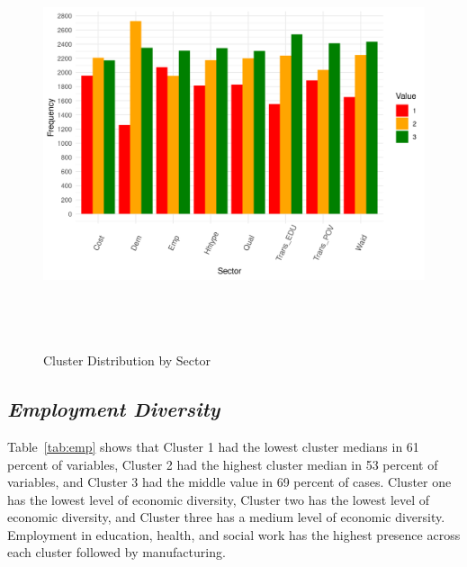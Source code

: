 \begin{figure}[htbp]
    \centering
     \includegraphics[width=1\textwidth, height=12cm]{plots/cluster_distribution.png}
     \caption{Cluster Distribution by Sector}
     \label{fig:cluster_dis}
 \end{figure}

\subsection{\textit{Employment Diversity}}

Table~\ref{tab:emp} shows that Cluster 1 had the lowest cluster medians in 61 percent of variables, Cluster 2 had the highest cluster median in 53 percent of variables, and Cluster 3 had the middle value in 69 %
percent of cases. Cluster one has the lowest level of economic diversity, Cluster two has the lowest level of economic diversity, and Cluster three has a medium level of economic diversity. Employment in education, health, and social work has the highest presence across each cluster followed by manufacturing. 




